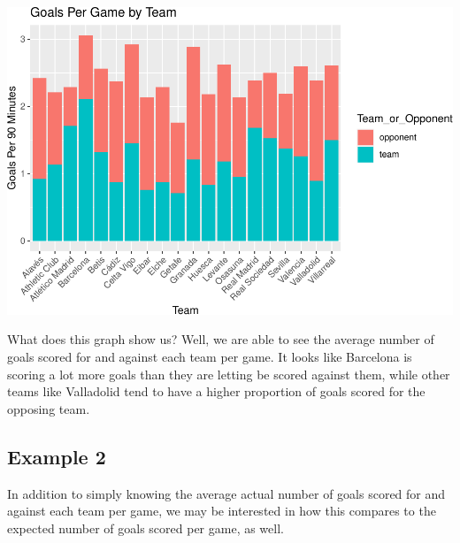 \documentclass[
  11pt,
]{book}
\theoremstyle{definition}
\theoremstyle{definition}
\theoremstyle{definition}
\theoremstyle{definition}
\theoremstyle{remark}
\begin{document}
\includegraphics{series_files/figure-latex/unnamed-chunk-14-1.pdf}

What does this graph show us? Well, we are able to see the average number of goals scored for and against each team per game. It looks like Barcelona is scoring a lot more goals than they are letting be scored against them, while other teams like Valladolid tend to have a higher proportion of goals scored for the opposing team.

\hypertarget{example-2}{%
\subsection*{Example 2}\label{example-2}}

In addition to simply knowing the average actual number of goals scored for and against each team per game, we may be interested in how this compares to the expected number of goals scored per game, as well.
\end{document}
